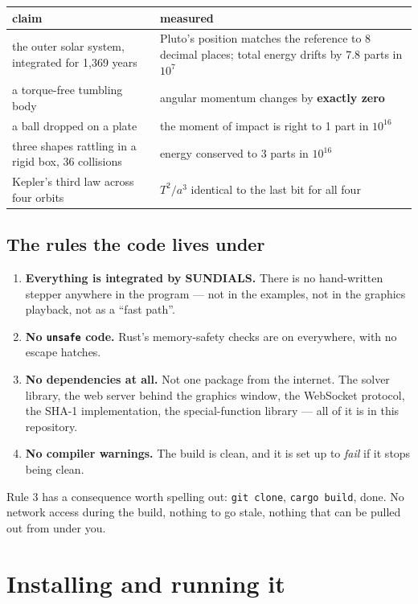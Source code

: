 \documentclass[11pt]{article}
\newcommand{\code}[1]{\texttt{#1}}
\begin{document}
\begin{center}
\begin{tabular}{p{7.2cm}p{7.2cm}}
\textbf{claim} & \textbf{measured}\\\hline
the outer solar system, integrated for 1{,}369 years & Pluto's position
matches the reference to 8 decimal places; total energy drifts by 7.8
parts in $10^{7}$\\
a torque-free tumbling body & angular momentum changes by
\textbf{exactly zero}\\
a ball dropped on a plate & the moment of impact is right to 1 part in
$10^{16}$\\
three shapes rattling in a rigid box, 36 collisions & energy conserved
to 3 parts in $10^{16}$\\
Kepler's third law across four orbits & $T^{2}/a^{3}$ identical to the
last bit for all four\\
\end{tabular}
\end{center}

\subsection{The rules the code lives under}

\begin{enumerate}
\item \textbf{Everything is integrated by SUNDIALS.} There is no
      hand-written stepper anywhere in the program --- not in the
      examples, not in the graphics playback, not as a ``fast path''.
\item \textbf{No \code{unsafe} code.} Rust's memory-safety checks are on
      everywhere, with no escape hatches.
\item \textbf{No dependencies at all.} Not one package from the
      internet. The solver library, the web server behind the graphics
      window, the WebSocket protocol, the SHA-1 implementation, the
      special-function library --- all of it is in this repository.
\item \textbf{No compiler warnings.} The build is clean, and it is set
      up to \emph{fail} if it stops being clean.
\end{enumerate}

Rule 3 has a consequence worth spelling out: \code{git clone},
\code{cargo build}, done. No network access during the build, nothing to
go stale, nothing that can be pulled out from under you.

\section{Installing and running it}
\end{document}
